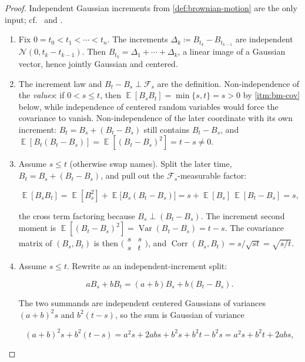 \documentclass[11pt,a4paper]{article}
\DeclareMathOperator{\Var}{Var}
\DeclareMathOperator{\Corr}{Corr}
\DeclareMathOperator{\E}{\mathbb{E}}
\begin{document}
\begin{proof}
Independent Gaussian increments from \cref{def:brownian-motion} are the only input; cf.\ \citep[Theorem~6.3, Exercises~6.19--6.27]{brzezniak1999} and \citep[Chapter~8]{durrett2010}.
\begin{enumerate}[label=\textup{(\roman*)}]
    \item
    Fix \(0=t_0<t_1<\cdots<t_n\). The increments \(\Delta_k\coloneqq B_{t_k}-B_{t_{k-1}}\) are independent \(\mathcal{N}(0,t_k-t_{k-1})\). Then \(B_{t_k}=\Delta_1+\cdots+\Delta_k\), a linear image of a Gaussian vector, hence jointly Gaussian and centered.
    \item
    The increment law and \(B_t-B_s\perp\mathcal{F}_s\) are the definition. Non-independence of the \emph{values}: if \(0<s\le t\), then \(\E[B_s B_t]=\min\{s,t\}=s>0\) by \ref{itm:bm-cov} below, while independence of centered random variables would force the covariance to vanish. Non-independence of the later coordinate with its own increment: \(B_t=B_s+(B_t-B_s)\) still contains \(B_t-B_s\), and \(\E[B_t(B_t-B_s)]=\E[(B_t-B_s)^2]=t-s\neq 0\).
    \item
    Assume \(s\le t\) (otherwise swap names). Split the later time, \(B_t=B_s+(B_t-B_s)\), and pull out the \(\mathcal{F}_s\)-measurable factor:

\[
\E[B_s B_t]
=
\E[B_s^2]
+
\E\bigl[B_s(B_t-B_s)\bigr]
=
s
+
\E[B_s]\,\E[B_t-B_s]
=
s,
\]

the cross term factoring because \(B_s\perp(B_t-B_s)\). The increment second moment is \(\E[(B_t-B_s)^2]=\Var(B_t-B_s)=t-s\). The covariance matrix of \((B_s,B_t)\) is then \(\bigl(\begin{smallmatrix}s&s\\s&t\end{smallmatrix}\bigr)\), and \(\Corr(B_s,B_t)=s/\sqrt{st}=\sqrt{s/t}\).
    \item
    Assume \(s\le t\). Rewrite as an independent-increment split:

\[
a B_s+b B_t
=
(a+b)B_s
+
b(B_t-B_s).
\]

The two summands are independent centered Gaussians of variances \((a+b)^2 s\) and \(b^2(t-s)\), so the sum is Gaussian of variance

\[
(a+b)^2 s+b^2(t-s)
=
a^2 s+2ab s+b^2 s+b^2 t-b^2 s
=
a^2 s+b^2 t+2ab s,
\]


\end{enumerate}
\end{proof}
\end{document}
